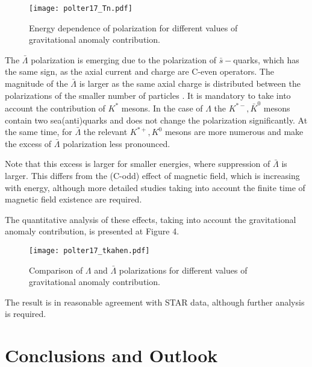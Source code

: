 \documentclass[preprint,aps,showpacs,nofootinbib,superscriptaddress,preprintnumbers,epsf,psf]{revtex4}
\begin{document}
\begin{figure}[h!]
\texttt{[image: polter17\_Tn.pdf]}
 \hspace{-20mm}
\caption{Energy dependence of polarization for different values of
gravitational anomaly contribution.}
\end{figure}


The $\bar \Lambda$ polarization is emerging due to the polarization of $\bar s-$quarks, which has the same sign, as the axial current and charge are C-even operators. The magnitude of the $\bar \Lambda$ 
is larger as the same axial charge is distributed between the polarizations of the smaller number of particles \cite{Sorin:2016smp}. It is mandatory to take into account the contribution of $K^*$ mesons. 
In the case of $\Lambda$ the $K^{*-}, \bar K^0$ mesons contain two sea(anti)quarks and does not change the polarization significantly. At the same time, for $\bar \Lambda$ the relevant $K^{*+}, K^0$
mesons are more numerous and make the excess of $\bar \Lambda$ polarization less pronounced. 

Note that this excess is larger for smaller energies, where suppression of $\bar \Lambda$ is larger. 
This differs from the (C-odd) effect of magnetic field, which is increasing with energy, although more detailed studies taking into account the finite time of magnetic field existence  are required. 

The quantitative analysis of these effects, taking into account the gravitational anomaly contribution, is presented at Figure 4. 
\begin{figure}[h!]
\texttt{[image: polter17\_tkahen.pdf]}
\caption{Comparison of $\Lambda$ and $\bar \Lambda$ polarizations for different values of
gravitational anomaly contribution.}
\end{figure}
The result is in reasonable agreement with STAR data, although further analysis 
is required. 


\section{Conclusions and Outlook}
\end{document}
